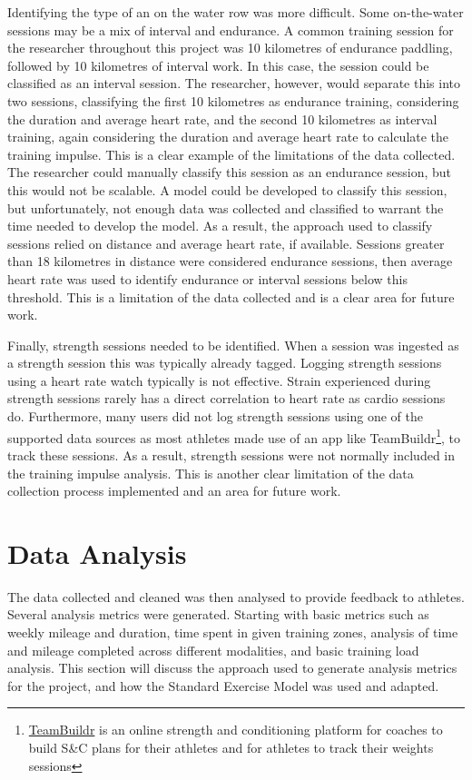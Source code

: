 Identifying the type of an on the water row was more difficult. Some on-the-water sessions may be a mix of interval and endurance. A common training session for the researcher throughout this project was 10 kilometres of endurance paddling, followed by 10 kilometres of interval work. In this case, the session could be classified as an interval session. The researcher, however, would separate this into two sessions, classifying the first 10 kilometres as endurance training, considering the duration and average heart rate, and the second 10 kilometres as interval training, again considering the duration and average heart rate to calculate the training impulse. This is a clear example of the limitations of the data collected. The researcher could manually classify this session as an endurance session, but this would not be scalable. A model could be developed to classify this session, but unfortunately, not enough data was collected and classified to warrant the time needed to develop the model. As a result, the approach used to classify sessions relied on distance and average heart rate, if available. Sessions greater than 18 kilometres in distance were considered endurance sessions, then average heart rate was used to identify endurance or interval sessions below this threshold. This is a limitation of the data collected and is a clear area for future work.

Finally, strength sessions needed to be identified. When a session was ingested as a strength session this was typically already tagged. Logging strength sessions using a heart rate watch typically is not effective. Strain experienced during strength sessions rarely has a direct correlation to heart rate as cardio sessions do. Furthermore, many users did not log strength sessions using one of the supported data sources as most athletes made use of an app like TeamBuildr\footnote{\href{https://www.teambuildr.com/}{TeamBuildr} is an online strength and conditioning platform for coaches to build S\&C plans for their athletes and for athletes to track their weights sessions}, to track these sessions. As a result, strength sessions were not normally included in the training impulse analysis.  This is another clear limitation of the data collection process implemented and an area for future work. 

\section{\label{sec:data-anyl}Data Analysis}
The data collected and cleaned was then analysed to provide feedback to athletes. Several analysis metrics were generated. Starting with basic metrics such as weekly mileage and duration, time spent in given training zones, analysis of time and mileage completed across different modalities, and basic training load analysis. This section will discuss the approach used to generate analysis metrics for the project, and how the Standard Exercise Model was used and adapted.

